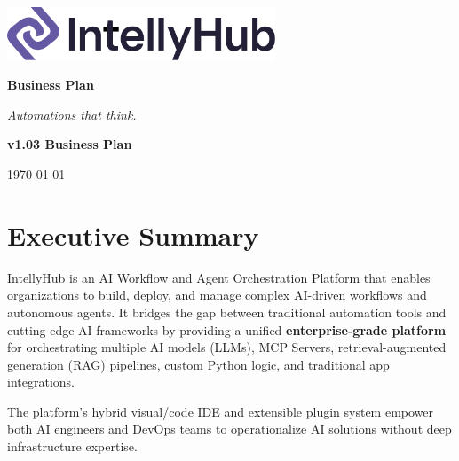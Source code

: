 \documentclass[11pt, a4paper, oneside]{article}
\begin{document}
\thispagestyle{empty} 
\begin{titlepage}
    \centering
    \vspace*{1cm}
    
    \includegraphics[width=0.6\textwidth]{IntellyHub_Logo_Colored.png}
    
    \vspace{2.5cm}
    
    {\Huge\bfseries\color{PrimaryColor}Business Plan}
    
    \vspace{1.5cm}
    
    {\Large\itshape\lightfont Automations that think.}
    
    \vfill %
    
    {\large\bfseries\color{PrimaryColor}v1.03 \color{SecondaryColor}Business Plan}
    
    \vspace{0.5cm}
    
    {\large \today}
    
\end{titlepage}

\tableofcontents
\newpage


\section{Executive Summary}
IntellyHub is an AI Workflow and Agent Orchestration Platform that enables organizations to build, deploy, and manage complex AI-driven workflows and autonomous agents. It bridges the gap between traditional automation tools and cutting-edge AI frameworks by providing a unified \textbf{enterprise-grade platform} for orchestrating multiple AI models (LLMs), MCP Servers, retrieval-aug\-ment\-ed generation (RAG) pipelines, custom Python logic, and traditional app integrations. 

The platform's hybrid visual/code IDE and extensible plugin system empower both AI engineers and DevOps teams to operationalize AI solutions without deep infrastructure expertise. 
\end{document}
